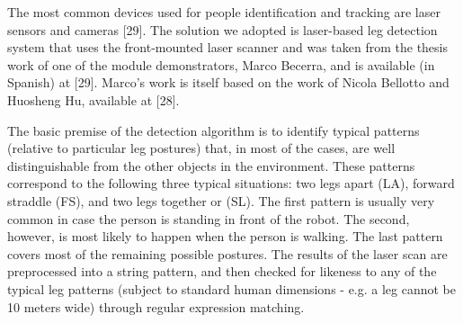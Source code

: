 \documentclass{article}
\begin{document}
\begin{multicols}{2}
The most common devices used for people identification and tracking are laser sensors and cameras [29]. The solution we adopted is laser-based leg detection system that uses the front-mounted laser scanner and was taken from the thesis work of one of the module demonstrators, Marco Becerra, and is available (in Spanish) at [29].  Marco’s work is itself based on the work of Nicola Bellotto and Huosheng Hu, available at [28].

The basic premise of the detection algorithm is to identify typical patterns (relative to particular leg postures) that, in most of the cases, are well distinguishable from the other objects in the environment. These patterns correspond to the following three typical situations: two legs apart (LA), forward straddle (FS), and two legs together or (SL). The first pattern is usually very common in case the person is standing in front of the robot. The second, however, is most likely to happen when the person is walking. The last pattern covers most of the remaining possible postures. The results of the laser scan are preprocessed into a string pattern, and then checked for likeness to any of the typical leg patterns (subject to standard human dimensions - e.g. a leg cannot be 10 meters wide) through regular expression matching.
\end{multicols}
\end{document}
